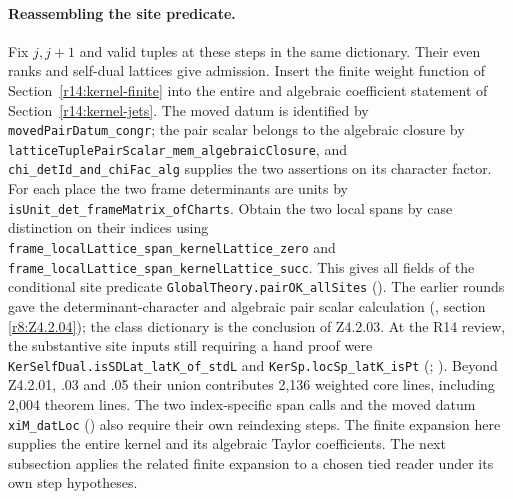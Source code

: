 \paragraph{Reassembling the site predicate.}\label{r14:site-pair}
Fix $j,j+1$ and valid tuples at these steps in the same dictionary.
Their even ranks and self-dual lattices give admission. Insert the
finite weight function of Section~\ref{r14:kernel-finite} into the
entire and algebraic coefficient statement of Section~\ref{r14:kernel-jets}.
The moved datum is identified by \nolinkurl{movedPairDatum_congr};
the pair scalar belongs to the algebraic closure by
\nolinkurl{latticeTuplePairScalar_mem_algebraicClosure}, and
\nolinkurl{chi_detId_and_chiFac_alg} supplies the two assertions
on its character factor. For each place the two frame determinants
are units by \nolinkurl{isUnit_det_frameMatrix_ofCharts}. Obtain the
two local spans by case distinction on their indices using
\nolinkurl{frame_localLattice_span_kernelLattice_zero} and
\nolinkurl{frame_localLattice_span_kernelLattice_succ}. This gives all
fields of the conditional site predicate
\nolinkurl{GlobalTheory.pairOK_allSites}
().
The earlier rounds gave the determinant-character and algebraic pair
scalar calculation (, section
\ref{r8:Z4.2.04}); the class dictionary is the conclusion of Z4.2.03.
At the R14 review, the substantive site inputs still requiring a hand
proof were \nolinkurl{KerSelfDual.isSDLat_latK_of_stdL} and
\nolinkurl{KerSp.locSp_latK_isPt}
(;
).
Beyond Z4.2.01, .03 and .05 their union contributes 2,136 weighted
core lines, including 2,004 theorem lines. The two index-specific span
calls and the moved datum \nolinkurl{xiM_datLoc}
() also require their
own reindexing steps. The finite expansion here supplies the entire
kernel and its algebraic Taylor coefficients.
The next subsection applies the related finite expansion to a chosen
tied reader under its own step hypotheses.

